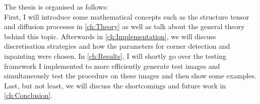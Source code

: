 The thesis is organised as follows:\\
First, I will introduce some mathematical concepts such as the structure tensor and diffusion
processes in \ref{ch:Theory} as well as talk about the general theory behind this topic.
Afterwards in \ref{ch:Implementation}, we will discuss discretisation strategies and how the
parameters for corner detection and inpainting were chosen.
In \ref{ch:Results}, I will shortly go over the testing framework I implemented to more efficiently
generate test images and simultaneously test the procedure on these images and then show some
examples.
Last, but not least, we will discuss the shortcomings and future work in \ref{ch:Conclusion}.
